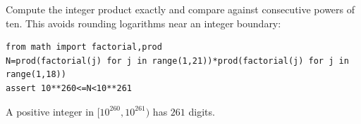 Compute the integer product exactly and compare against consecutive powers of ten. This avoids rounding logarithms near an integer boundary:
\begin{verbatim}
from math import factorial,prod
N=prod(factorial(j) for j in range(1,21))*prod(factorial(j) for j in range(1,18))
assert 10**260<=N<10**261
\end{verbatim}
A positive integer in $[10^{260},10^{261})$ has $\boxed{261}$ digits.
